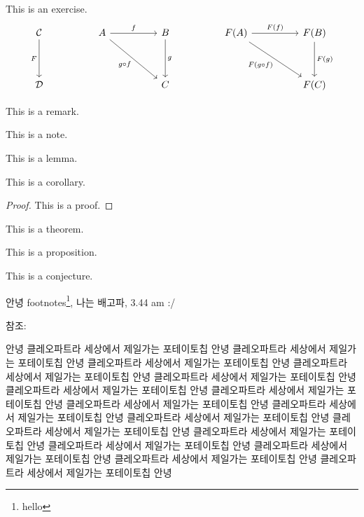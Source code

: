 \documentclass[../example.tex]{subfiles}
\begin{document}
\begin{exercise}
  This is an exercise.
  \[\begin{tikzcd}
    \mathcal C \arrow[dd, "F"'] &  & A \arrow[rr, "f"] \arrow[rrdd, "g\circ f"'] &  & B \arrow[dd, "g"] &  & F(A) \arrow[rr, "F(f)"] \arrow[rrdd, "F(g \circ f)"'] &  & F(B) \arrow[dd, "F(g)"] \\
                                &  &                                             &  &                   &  &                                                       &  &                         \\
    \mathcal D                  &  &                                             &  & C                 &  &                                                       &  & F(C)                   
  \end{tikzcd}\]
\end{exercise}
\begin{remark}
  This is a remark.
\end{remark}
\begin{note}
  This is a note.
\end{note}
\begin{lemma}
  This is a lemma.
\end{lemma}
\begin{corollary}
  This is a corollary.
\end{corollary}
\begin{proof}
  This is a proof.
\end{proof}
\begin{theorem}
  This is a theorem.
\end{theorem}
\begin{proposition}
  This is a proposition.
\end{proposition}
\begin{conjecture}
  This is a conjecture.
\end{conjecture}

안녕 footnotes\footnote{hello}, 나는 배고파, 3.44 am :/

참조: \cite{DeterministicNonperiodicFlow}

안녕 클레오파트라 세상에서 제일가는 포테이토칩 안녕 클레오파트라 세상에서 제일가는 포테이토칩 안녕 클레오파트라 세상에서 제일가는 포테이토칩 안녕 클레오파트라 세상에서 제일가는 포테이토칩 안녕 클레오파트라 세상에서 제일가는 포테이토칩 안녕 클레오파트라 세상에서 제일가는 포테이토칩 안녕 클레오파트라 세상에서 제일가는 포테이토칩 안녕 클레오파트라 세상에서 제일가는 포테이토칩 안녕 클레오파트라 세상에서 제일가는 포테이토칩 안녕 클레오파트라 세상에서 제일가는 포테이토칩 안녕 클레오파트라 세상에서 제일가는 포테이토칩 안녕 클레오파트라 세상에서 제일가는 포테이토칩 안녕 클레오파트라 세상에서 제일가는 포테이토칩 안녕 클레오파트라 세상에서 제일가는 포테이토칩 안녕 클레오파트라 세상에서 제일가는 포테이토칩 안녕 클레오파트라 세상에서 제일가는 포테이토칩 안녕 
\end{document}
